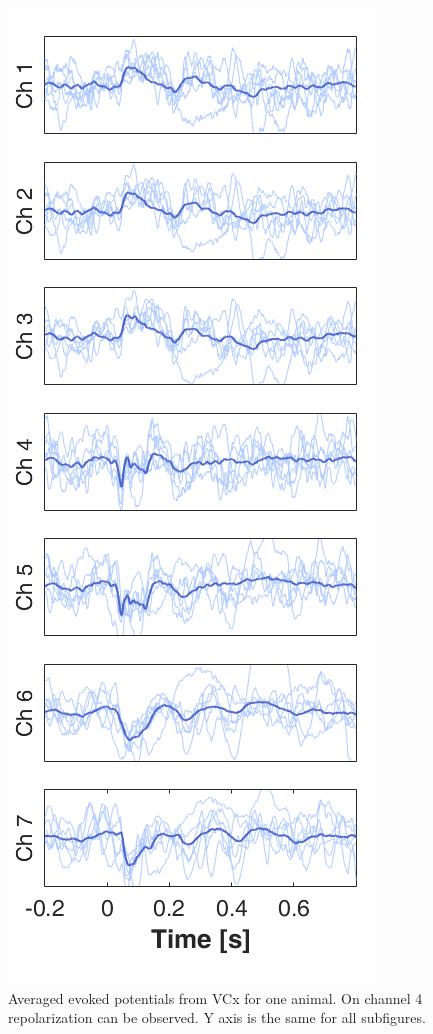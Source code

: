 \documentclass{pracalicmgr}
\begin{document}
        \begin{figure}[H]
    	\begin{center}
    		\includegraphics[scale=0.65]{usrednianie3.png}
    	\end{center}
    	\caption{Averaged evoked potentials from VCx for one animal. On channel 4 repolarization can be observed. Y axis is the same for all subfigures. }
    	\label{rys:usrednianie}
    \end{figure} 
    
\end{document}
